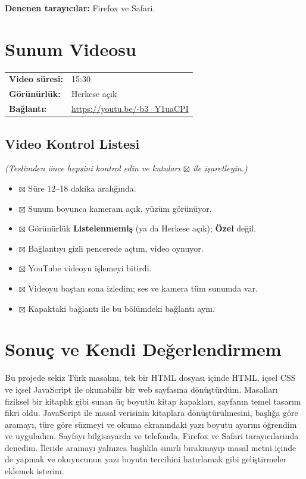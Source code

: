 \documentclass[12pt,a4paper]{article}
\newcommand{\aciklama}[1]{{\color{gray}\itshape (#1)}}
\newcommand{\youtubelink}{\url{https://youtu.be/-b3_Y1uaCPI}}
\begin{document}
\textbf{Denenen tarayıcılar:} Firefox ve Safari.

\section{Sunum Videosu}
\begin{center}
\begin{tabular}{@{}ll@{}}
\textbf{Video süresi:} & 15:30 \quad \aciklama{12--18 dakika olmalıdır} \\
\textbf{Görünürlük:} & Herkese açık \\
\textbf{Bağlantı:} & \youtubelink \\
\end{tabular}
\end{center}

\subsection{Video Kontrol Listesi}
\aciklama{Teslimden önce hepsini kontrol edin ve kutuları $\boxtimes$ ile işaretleyin.}
\begin{itemize}[label={}]
  \item $\boxtimes$ Süre 12--18 dakika aralığında.
  \item $\boxtimes$ Sunum boyunca kameram açık, yüzüm görünüyor.
  \item $\boxtimes$ Görünürlük \textbf{Listelenmemiş} (ya da Herkese açık); \textbf{Özel} değil.
  \item $\boxtimes$ Bağlantıyı gizli pencerede açtım, video oynuyor.
  \item $\boxtimes$ YouTube videoyu işlemeyi bitirdi.
  \item $\boxtimes$ Videoyu baştan sona izledim; ses ve kamera tüm sunumda var.
  \item $\boxtimes$ Kapaktaki bağlantı ile bu bölümdeki bağlantı aynı.
\end{itemize}

\section{Sonuç ve Kendi Değerlendirmem}
Bu projede sekiz Türk masalını, tek bir HTML dosyası içinde HTML, içsel CSS ve içsel
JavaScript ile okunabilir bir web sayfasına dönüştürdüm. Masalları fiziksel bir
kitaplık gibi sunan üç boyutlu kitap kapakları, sayfanın temel tasarım fikri oldu.
JavaScript ile masal verisinin kitaplara dönüştürülmesini, başlığa göre aramayı, türe
göre süzmeyi ve okuma ekranındaki yazı boyutu ayarını öğrendim ve uyguladım. Sayfayı
bilgisayarda ve telefonda, Firefox ve Safari tarayıcılarında denedim. İleride aramayı
yalnızca başlıkla sınırlı bırakmayıp masal metni içinde de yapmak ve okuyucunun yazı
boyutu tercihini hatırlamak gibi geliştirmeler eklemek isterim.
\end{document}
